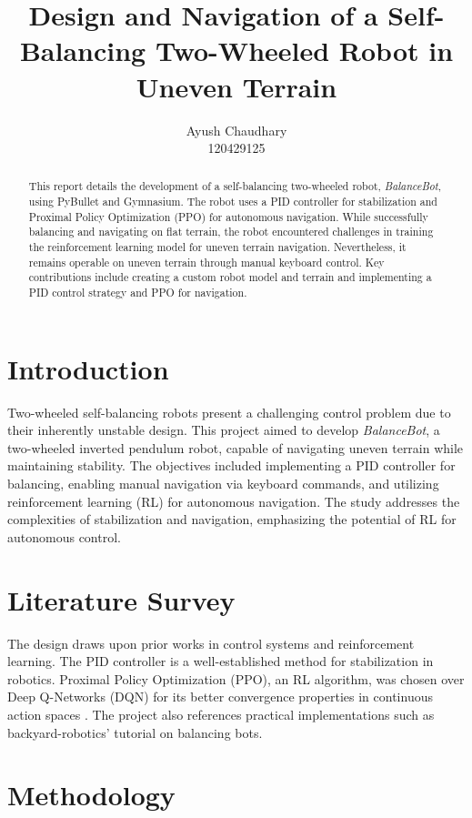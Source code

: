 \documentclass[12pt, draftclsnofoot, onecolumn]{IEEEtran}
\title{Design and Navigation of a Self-Balancing Two-Wheeled Robot in Uneven Terrain}
\author{Ayush Chaudhary \\ 120429125}
\begin{document}
\maketitle

\begin{abstract}
This report details the development of a self-balancing two-wheeled robot, \textit{BalanceBot}, using PyBullet and Gymnasium. The robot uses a PID controller for stabilization and Proximal Policy Optimization (PPO) for autonomous navigation. While successfully balancing and navigating on flat terrain, the robot encountered challenges in training the reinforcement learning model for uneven terrain navigation. Nevertheless, it remains operable on uneven terrain through manual keyboard control. Key contributions include creating a custom robot model and terrain and implementing a PID control strategy and PPO for navigation.
\end{abstract}

\section{Introduction}
Two-wheeled self-balancing robots present a challenging control problem due to their inherently unstable design. This project aimed to develop \textit{BalanceBot}, a two-wheeled inverted pendulum robot, capable of navigating uneven terrain while maintaining stability. The objectives included implementing a PID controller for balancing, enabling manual navigation via keyboard commands, and utilizing reinforcement learning (RL) for autonomous navigation. The study addresses the complexities of stabilization and navigation, emphasizing the potential of RL for autonomous control.

\section{Literature Survey}
The design draws upon prior works in control systems and reinforcement learning. The PID controller is a well-established method for stabilization in robotics. Proximal Policy Optimization (PPO), an RL algorithm, was chosen over Deep Q-Networks (DQN) for its better convergence properties in continuous action spaces \cite{schulman2017proximal}. The project also references practical implementations such as backyard-robotics'\cite{backyard} tutorial on balancing bots.

\section{Methodology}
\end{document}
